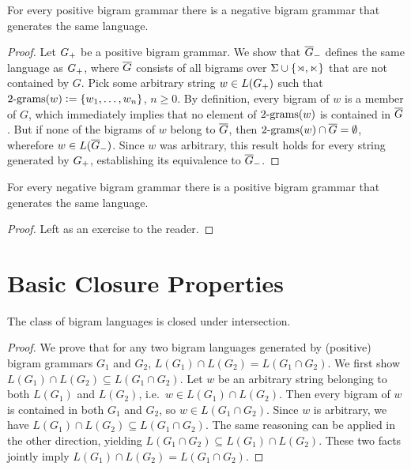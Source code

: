 \begin{lemma}
    For every positive bigram grammar there is a negative bigram grammar that generates the same language.
\end{lemma}
%
\begin{proof}
    Let $G_{+}$ be a positive bigram grammar. 
    We show that $ \overline{G} _{-}$ defines the same language as $G_{+}$, where $ \overline{G} $ consists of all bigrams over $\Sigma \cup \left \{ \rtimes, \ltimes \right \}$ that are not contained by $G$.
    Pick some arbitrary string $w \in L(G_{+})$ such that $\mathrm{2\text{-}grams}(w) \mathrel{\mathop:}= \left \{  w_1, \ldots, w_n  \right \}$, $n \geq 0$.
    By definition, every bigram of $w$ is a member of $G$, which immediately implies that no element of $\mathrm{2\text{-}grams}(w)$ is contained in $ \overline{G} $.
    But if none of the bigrams of $w$ belong to $ \overline{G} $, then $\mathrm{2\text{-}grams}(w) \cap  \overline{G}  = \emptyset$, wherefore $w \in L( \overline{G} _{-})$.
    Since $w$ was arbitrary, this result holds for every string generated by $G_{+}$, establishing its equivalence to $ \overline{G} _{-}$.
\end{proof}

\begin{lemma}
    For every negative bigram grammar there is a positive bigram grammar that generates the same language.
\end{lemma}
%
\begin{proof}
    Left as an exercise to the reader.
\end{proof}


\section{Basic Closure Properties}

\begin{lemma}
    The class of bigram languages is closed under intersection.    
\end{lemma}
%
\begin{proof}
    We prove that for any two bigram languages generated by (positive) bigram grammars $G_1$ and $G_2$, $L(G_1) \cap L(G_2) = L(G_1 \cap G_2)$.
    We first show $L(G_1) \cap L(G_2) \subseteq L(G_1 \cap G_2)$.
    Let $w$ be an arbitrary string belonging to both $L(G_1)$ and $L(G_2)$, i.e.\ $w \in L(G_1) \cap L(G_2)$.
    Then every bigram of $w$ is contained in both $G_1$ and $G_2$, so $w \in L(G_1 \cap G_2)$.
    Since $w$ is arbitrary, we have $L(G_1) \cap L(G_2) \subseteq L(G_1 \cap G_2)$.
    The same reasoning can be applied in the other direction, yielding $L(G_1 \cap G_2) \subseteq L(G_1) \cap L(G_2)$.
    These two facts jointly imply $L(G_1) \cap L(G_2) = L(G_1 \cap G_2)$.
\end{proof}
%

